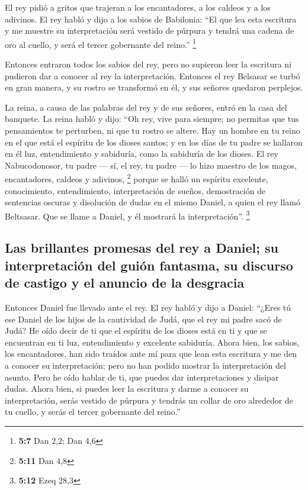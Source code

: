 \begin{paracol}{2}
 El rey pidió a gritos que trajeran a los encantadores, a
los caldeos y a los adivinos. El rey habló y dijo a los sabios de
Babilonia: ``El que lea esta escritura y me muestre su interpretación
será vestido de púrpura y tendrá una cadena de oro al cuello, y será el
tercer gobernante del reino.'' \footnote{\textbf{5:7} Dan 2,2; Dan 4,6}

 Entonces entraron todos los sabios del rey, pero no
supieron leer la escritura ni pudieron dar a conocer al rey la
interpretación.  Entonces el rey Belsasar se turbó en gran
manera, y su rostro se transformó en él, y sus señores quedaron
perplejos.

 La reina, a causa de las palabras del rey y de sus
señores, entró en la casa del banquete. La reina habló y dijo: ``Oh rey,
vive para siempre; no permitas que tus pensamientos te perturben, ni que
tu rostro se altere.  Hay un hombre en tu reino en el que
está el espíritu de los dioses santos; y en los días de tu padre se
hallaron en él luz, entendimiento y sabiduría, como la sabiduría de los
dioses. El rey Nabucodonosor, tu padre --- sí, el rey, tu padre --- lo
hizo maestro de los magos, encantadores, caldeos y adivinos, \footnote{\textbf{5:11}
  Dan 4,8}  porque se halló un espíritu excelente,
conocimiento, entendimiento, interpretación de sueños, demostración de
sentencias oscuras y disolución de dudas en el mismo Daniel, a quien el
rey llamó Beltsasar. Que se llame a Daniel, y él mostrará la
interpretación''. \footnote{\textbf{5:12} Ezeq 28,3}

\hypertarget{las-brillantes-promesas-del-rey-a-daniel-su-interpretaciuxf3n-del-guiuxf3n-fantasma-su-discurso-de-castigo-y-el-anuncio-de-la-desgracia}{%
\subsection{Las brillantes promesas del rey a Daniel; su interpretación
del guión fantasma, su discurso de castigo y el anuncio de la
desgracia}\label{las-brillantes-promesas-del-rey-a-daniel-su-interpretaciuxf3n-del-guiuxf3n-fantasma-su-discurso-de-castigo-y-el-anuncio-de-la-desgracia}}

 Entonces Daniel fue llevado ante el rey. El rey habló y
dijo a Daniel: ``¿Eres tú ese Daniel de los hijos de la cautividad de
Judá, que el rey mi padre sacó de Judá?  He oído decir de
ti que el espíritu de los dioses está en ti y que se encuentran en ti
luz, entendimiento y excelente sabiduría.  Ahora bien,
los sabios, los encantadores, han sido traídos ante mí para que lean
esta escritura y me den a conocer su interpretación; pero no han podido
mostrar la interpretación del asunto.  Pero he oído
hablar de ti, que puedes dar interpretaciones y disipar dudas. Ahora
bien, si puedes leer la escritura y darme a conocer su interpretación,
serás vestido de púrpura y tendrás un collar de oro alrededor de tu
cuello, y serás el tercer gobernante del reino.''


\end{paracol}
